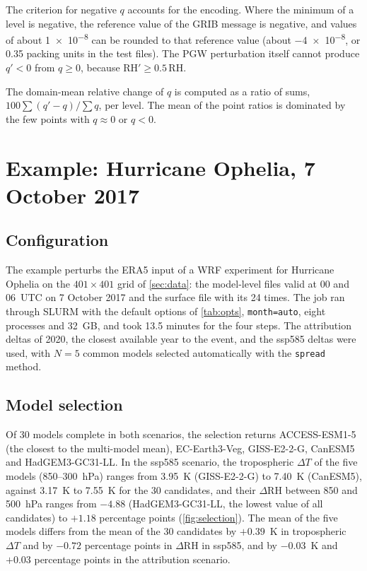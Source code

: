 \documentclass[11pt,a4paper]{article}
\newcommand{\code}[1]{\texttt{#1}}
\newcommand{\dT}{\Delta T}
\newcommand{\dRH}{\Delta \mathrm{RH}}
\begin{document}
The criterion for negative $q$ accounts for the encoding. Where the minimum
of a level is negative, the reference value of the GRIB message is negative,
and values of about \num{1e-8} can be rounded to that reference value
(about \num{-4e-8}, or 0.35 packing units in the test files). The PGW
perturbation itself cannot produce $q' < 0$ from $q \ge 0$, because
$\mathrm{RH}' \ge 0.5\,\mathrm{RH}$.

The domain-mean relative change of $q$ is computed as a ratio of sums,
$100\sum(q'-q)/\sum q$, per level. The mean of the point ratios is dominated
by the few points with $q \approx 0$ or $q < 0$.

\section{Example: Hurricane Ophelia, 7 October 2017}
\label{sec:example}

\subsection{Configuration}

The example perturbs the ERA5 input of a WRF experiment for Hurricane Ophelia
on the $401\times401$ grid of \cref{sec:data}: the model-level files valid at
00 and 06~UTC on 7 October 2017 and the surface file with its 24 times. The
job ran through SLURM with the default options of \cref{tab:opts},
\code{month=auto}, eight processes and \SI{32}{GB}, and took 13.5 minutes for
the four steps. The attribution deltas of 2020, the closest available year to
the event, and the ssp585 deltas were used, with $N=5$ common models selected
automatically with the \code{spread} method.

\subsection{Model selection}

Of 30 models complete in both scenarios, the selection returns ACCESS-ESM1-5
(the closest to the multi-model mean), EC-Earth3-Veg, GISS-E2-2-G, CanESM5
and HadGEM3-GC31-LL. In the ssp585 scenario, the tropospheric $\dT$ of the
five models (850--\SI{300}{hPa}) ranges from \SI{3.95}{K} (GISS-E2-2-G) to
\SI{7.40}{K} (CanESM5), against \SI{3.17}{K} to \SI{7.55}{K} for the 30
candidates, and their $\dRH$ between 850 and \SI{500}{hPa} ranges from
$-4.88$ (HadGEM3-GC31-LL, the lowest value of all candidates) to $+1.18$
percentage points (\cref{fig:selection}). The mean of the five models differs
from the mean of the 30 candidates by $+0.39$~K in tropospheric $\dT$ and by
$-0.72$ percentage points in $\dRH$ in ssp585, and by $-0.03$~K and $+0.03$
percentage points in the attribution scenario.
\end{document}
